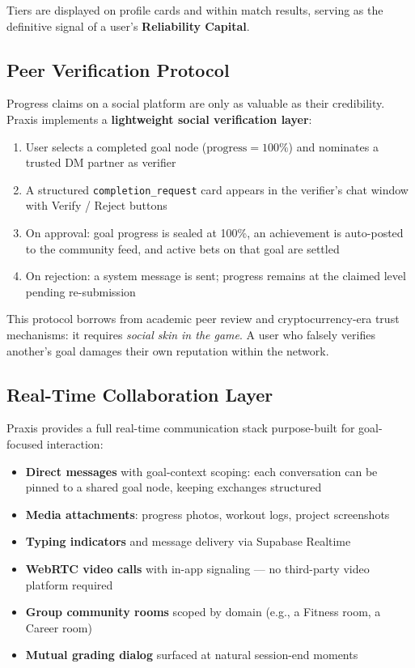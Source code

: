 \documentclass[11pt,a4paper]{article}
\begin{document}
Tiers are displayed on profile cards and within match results, serving as the definitive signal of a user's \textbf{Reliability Capital}.

\subsection{Peer Verification Protocol}

Progress claims on a social platform are only as valuable as their credibility. Praxis implements a \textbf{lightweight social verification layer}:

\begin{enumerate}
  \item User selects a completed goal node ($\text{progress} = 100\%$) and nominates a trusted DM partner as verifier
  \item A structured \texttt{completion\_request} card appears in the verifier's chat window with Verify / Reject buttons
  \item On approval: goal progress is sealed at 100\%, an achievement is auto-posted to the community feed, and active bets on that goal are settled
  \item On rejection: a system message is sent; progress remains at the claimed level pending re-submission
\end{enumerate}

This protocol borrows from academic peer review and cryptocurrency-era trust mechanisms: it requires \textit{social skin in the game}. A user who falsely verifies another's goal damages their own reputation within the network.

\subsection{Real-Time Collaboration Layer}

Praxis provides a full real-time communication stack purpose-built for goal-focused interaction:

\begin{itemize}
  \item \textbf{Direct messages} with goal-context scoping: each conversation can be pinned to a shared goal node, keeping exchanges structured
  \item \textbf{Media attachments}: progress photos, workout logs, project screenshots
  \item \textbf{Typing indicators} and message delivery via Supabase Realtime
  \item \textbf{WebRTC video calls} with in-app signaling — no third-party video platform required
  \item \textbf{Group community rooms} scoped by domain (e.g., a Fitness room, a Career room)
  \item \textbf{Mutual grading dialog} surfaced at natural session-end moments
\end{itemize}
\end{document}
